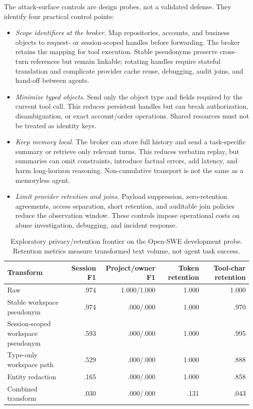 \documentclass[letterpaper]{article} %
\begin{document}
The attack-surface controls are design probes, not a validated defense. They identify four practical
control points:
\begin{itemize}
  \item \emph{Scope identifiers at the broker.} Map repositories, accounts, and business objects to
  request- or session-scoped handles before forwarding. The broker retains the mapping for tool
  execution. Stable pseudonyms preserve cross-turn references but remain linkable; rotating handles
  require stateful translation and complicate provider cache reuse, debugging, audit joins, and
  hand-off between agents.
  \item \emph{Minimize typed objects.} Send only the object type and fields required by the current
  tool call. This reduces persistent handles but can break authorization, disambiguation, or exact
  account/order operations. Shared resources must not be treated as identity keys.
  \item \emph{Keep memory local.} The broker can store full history and send a task-specific summary
  or retrieve only relevant turns. This reduces verbatim replay, but summaries can omit constraints,
  introduce factual errors, add latency, and harm long-horizon reasoning. Non-cumulative transport is
  not the same as a memoryless agent.
  \item \emph{Limit provider retention and joins.} Payload suppression, zero-retention agreements,
  access separation, short retention, and auditable join policies reduce the observation window.
  These controls impose operational costs on abuse investigation, debugging, and incident response.
\end{itemize}

\begin{table}[t]
\centering
\small
\begin{tabular}{@{}lrrrr@{}}
\toprule
Transform & Session F1 & Project/owner F1 & Token retention & Tool-char retention \\
\midrule
Raw & .974 & 1.000/1.000 & 1.000 & 1.000 \\
Stable workspace pseudonym & .974 & .000/.000 & 1.000 & .970 \\
Session-scoped workspace pseudonym & .593 & .000/.000 & 1.000 & .995 \\
Type-only workspace path & .529 & .000/.000 & 1.000 & .888 \\
Entity redaction & .165 & .000/.000 & 1.000 & .858 \\
Combined transform & .030 & .000/.000 & .131 & .043 \\
\bottomrule
\end{tabular}
\caption{Exploratory privacy/retention frontier on the Open-SWE development probe. Retention metrics
measure transformed text volume, not agent task success.}
\end{table}
\end{document}
